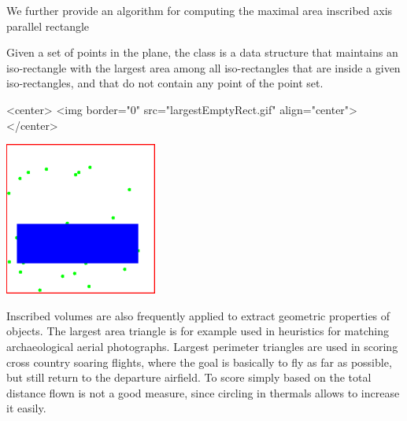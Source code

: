 We further provide an algorithm for computing the maximal area
inscribed axis parallel rectangle 

Given a set of points in the plane, the class 
is a data structure that maintains an iso-rectangle with the largest area among
all iso-rectangles that are inside a given iso-rectangles, and
that do not contain any point of the point set.

\begin{ccHtmlOnly}
<center>
<img border="0" src="largestEmptyRect.gif" align="center">
</center>
\end{ccHtmlOnly} 

\begin{ccTexOnly}
\begin{center}
\includegraphics[width=5cm]{Optimisation/largestEmptyRect}
\end{center}
\end{ccTexOnly}

Inscribed volumes are also frequently applied to extract
geometric properties of objects. The largest area triangle is for example used in
heuristics for matching archaeological aerial photographs. Largest
perimeter triangles are used in scoring cross country soaring flights,
where the goal is basically to fly as far as possible, but still
return to the departure airfield. To score simply based on the total
distance flown is not a good measure, since circling in thermals
allows to increase it easily.



